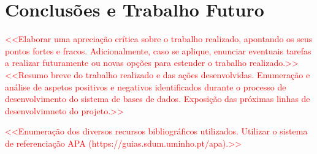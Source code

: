 \documentclass[a4paper,12pt]{scrreprt}
\begin{document}


\chapter{Conclusões e Trabalho Futuro}
    \textcolor{red}{
        <<Elaborar uma apreciação crítica sobre o trabalho realizado, apontando os seus pontos fortes e fracos. Adicionalmente, caso se aplique, enunciar eventuais tarefas a realizar futuramente ou novas opções para estender o trabalho realizado.>> \\
        <<Resumo breve do trabalho realizado e das ações desenvolvidas. Enumeração e análise de aspetos positivos e negativos identificados durante o processo de desenvolvimento do sistema de bases de dados. Exposição das próximas linhas de desenvolvimneto do projeto.>>
    }




\begin{thebibliography}{9}
\textcolor{red}{
    <<Enumeração dos diversos recursos bibliográficos utilizados. Utilizar o sistema de referenciação APA (https://guias.sdum.uminho.pt/apa).>>
}
\end{thebibliography}


\end{document}

